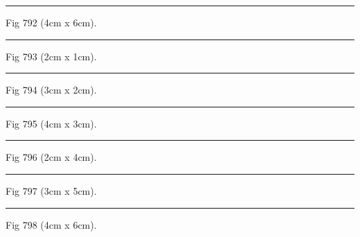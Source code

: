 \documentclass[a4paper,11pt]{article}
\begin{document}
\begin{swarmwrap}%
  \begin{minipage}[t]{4cm}
    \centering
    \rule{\linewidth}{6cm}
    {\footnotesize Fig 792 (4cm x 6cm).}
  \end{minipage}%
\end{swarmwrap}%
\swarmwrapnext
\lipsum[42]%

\begin{swarmwrap}%
  \begin{minipage}[t]{2cm}
    \centering
    \rule{\linewidth}{1cm}
    {\footnotesize Fig 793 (2cm x 1cm).}
  \end{minipage}%
\end{swarmwrap}%
\swarmwrapnext
\lipsum[43]%

\begin{swarmwrap}%
  \begin{minipage}[t]{3cm}
    \centering
    \rule{\linewidth}{2cm}
    {\footnotesize Fig 794 (3cm x 2cm).}
  \end{minipage}%
\end{swarmwrap}%
\swarmwrapnext
\lipsum[44]%

\begin{swarmwrap}%
  \begin{minipage}[t]{4cm}
    \centering
    \rule{\linewidth}{3cm}
    {\footnotesize Fig 795 (4cm x 3cm).}
  \end{minipage}%
\end{swarmwrap}%
\swarmwrapnext
\lipsum[45]%

\begin{swarmwrap}%
  \begin{minipage}[t]{2cm}
    \centering
    \rule{\linewidth}{4cm}
    {\footnotesize Fig 796 (2cm x 4cm).}
  \end{minipage}%
\end{swarmwrap}%
\swarmwrapnext
\lipsum[46]%

\begin{swarmwrap}%
  \begin{minipage}[t]{3cm}
    \centering
    \rule{\linewidth}{5cm}
    {\footnotesize Fig 797 (3cm x 5cm).}
  \end{minipage}%
\end{swarmwrap}%
\swarmwrapnext
\lipsum[47]%

\begin{swarmwrap}%
  \begin{minipage}[t]{4cm}
    \centering
    \rule{\linewidth}{6cm}
    {\footnotesize Fig 798 (4cm x 6cm).}
  \end{minipage}%
\end{swarmwrap}%
\swarmwrapnext
\lipsum[48]%
\end{document}
